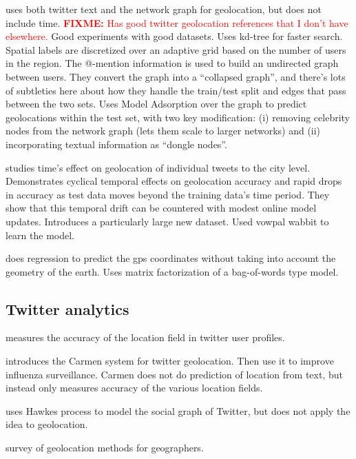 \documentclass{article}
\newcommand{\fixme}[1]{\textcolor{red}{\textbf{FIXME:} {#1}}}
\begin{document}
\citet{rahimi2015twitter} uses both twitter text and the network graph for geolocation, but does not include time.
\fixme{Has good twitter geolocation references that I don't have elsewhere.}
Good experiments with good datasets.
Uses kd-tree for faster search.
Spatial labels are discretized over an adaptive grid based on the number of users in the region.
The @-mention information is used to build an undirected graph between users.
They convert the graph into a ``collapsed graph'', and there's lots of subtleties here about how they handle the train/test split and edges that pass between the two sets.
Uses Model Adsorption over the graph to predict geolocations within the test set, 
with two key modification:
(i) removing celebrity nodes from the network graph (lets them scale to larger networks)
and (ii) incorporating textual information as ``dongle nodes''.

\citet{dredze2016geolocation} studies time's effect on geolocation of individual tweets to the city level.
Demonstrates cyclical temporal effects on geolocation accuracy and rapid drops in accuracy as test data moves beyond the training data's time period.
They show that this temporal drift can be countered with modest online model updates.
Introduces a particularly large new dataset.
Used vowpal wabbit to learn the model.

\citet{duong2016near} does regression to predict the gps coordinates without taking into account the geometry of the earth.
Uses matrix factorization of a bag-of-words type model.


\subsection{Twitter analytics}

\citet{hecht2011tweets} measures the accuracy of the location field in twitter user profiles.

\citet{dredze2013carmen} introduces the Carmen system for twitter geolocation.
Then use it to improve influenza surveillance.
Carmen does not do prediction of location from text,
but instead only measures accuracy of the various location fields.

\citet{he2015hawkestopic} uses Hawkes process to model the social graph of Twitter,
but does not apply the idea to geolocation.

\citet{graham2014world} survey of geolocation methods for geographers.
\end{document}
